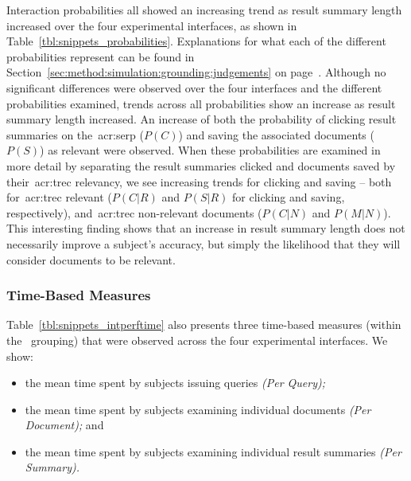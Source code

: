 Interaction probabilities all showed an increasing trend as result summary length increased over the four experimental interfaces, as shown in Table~\ref{tbl:snippets_probabilities}. Explanations for what each of the different probabilities represent can be found in Section~\ref{sec:method:simulation:grounding:judgements} on page~\pageref{sec:method:simulation:grounding:judgements}. Although no significant differences were observed over the four interfaces and the different probabilities examined, trends across all probabilities show an increase as result summary length increased. An increase of both the probability of clicking result summaries on the~\gls{acr:serp} ($P(C)$) and saving the associated documents ($P(S)$) as relevant were observed. When these probabilities are examined in more detail by separating the result summaries clicked and documents saved by their~\gls{acr:trec} relevancy, we see increasing trends for clicking and saving -- both for~\gls{acr:trec} relevant ($P(C|R)$ and $P(S|R)$ for clicking and saving, respectively), and~\gls{acr:trec} non-relevant documents ($P(C|N)$ and $P(M|N)$). This interesting finding shows that an increase in result summary length does not necessarily improve a subject's accuracy, but simply the likelihood that they will consider documents to be relevant.


\subsubsection{Time-Based Measures}\label{chap:snippets:user:results:time}
Table~\ref{tbl:snippets_intperftime} also presents three time-based measures (within the ~grouping) that were observed across the four experimental interfaces. We show:

\begin{itemize}
    \item{the mean time spent by subjects issuing queries \emph{(Per Query);}}
    \item{the mean time spent by subjects examining individual documents \emph{(Per Document);} and}
    \item{the mean time spent by subjects examining individual result summaries \emph{(Per Summary).}}
\end{itemize}

